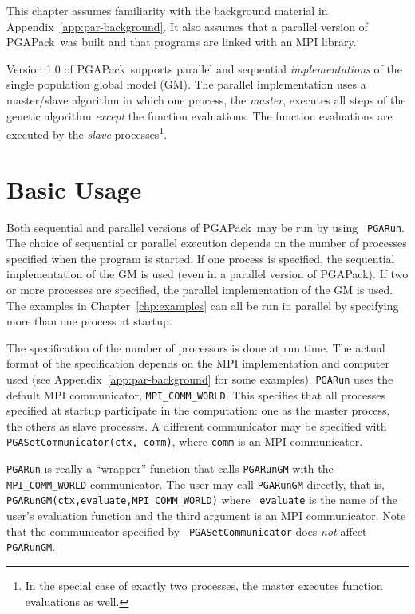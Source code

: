 \documentclass{report}
\newcommand{\pga}{PGAPack}
\begin{document}
This chapter assumes familiarity with the background material in
Appendix~\ref{app:par-background}.  It also assumes that a parallel version of
\pga\ was built and that programs are linked with
an MPI library.

Version 1.0 of \pga\ supports parallel and sequential {\em implementations} of
the single population global model (GM).  The parallel implementation uses a
master/slave algorithm in which one process, the {\em master}, executes all
steps of the genetic algorithm {\em except} the function evaluations.  The
function evaluations are executed by the {\em slave} processes\footnote{In the
special case of exactly two processes, the master executes function
evaluations as well.}.

\section{Basic Usage}\label{sec:par-basic-usage}

Both sequential and parallel versions of \pga\ may be run by using {\tt
PGARun}.  The choice of sequential or parallel execution depends on the number
of processes specified when the program is started.  If one process is
specified, the sequential implementation of the GM is used (even in a parallel
version of
\pga).  If two or more processes are specified, the parallel implementation of
the GM is used.  The examples in Chapter~\ref{chp:examples} can all be run in
parallel by specifying more than one process at startup.

The specification of the number of processors is done at run time.  The actual
format of the specification depends on the MPI implementation and computer
used (see Appendix~\ref{app:par-background} for some examples).  {\tt PGARun}
uses the default MPI communicator, {\tt MPI\_COMM\_WORLD}.  This specifies
that all processes specified at startup participate in the computation: one as
the master process, the others as slave processes.  A different communicator
may be specified with {\tt PGASetCommunicator(ctx, comm)}, where {\tt comm} is
an MPI communicator.

{\tt PGARun} is really a ``wrapper'' function that calls {\tt PGARunGM} with
the {\tt MPI\_COMM\_WORLD} communicator.  The user may call {\tt PGARunGM}
directly, that is, {\tt PGARunGM(ctx,evaluate,MPI\_COMM\_WORLD)} where {\tt
evaluate} is the name of the user's evaluation function and the third argument
is an MPI communicator.  Note that the communicator specified by {\tt
PGASetCommunicator} does {\em not} affect {\tt PGARunGM}.
\end{document}
